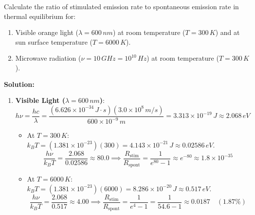 \begin{example}
Calculate the ratio of stimulated emission rate to spontaneous emission rate in thermal equilibrium for:
\begin{enumerate}
    \item Visible orange light ($\lambda = 600\,\si{nm}$) at room temperature ($T = 300\,\si{K}$) and at sun surface temperature ($T = 6000\,\si{K}$).
    \item Microwave radiation ($\nu = 10\,\si{GHz} = 10^{10}\,\si{Hz}$) at room temperature ($T = 300\,\si{K}$).
\end{enumerate}

\textbf{Solution:}
\begin{enumerate}
    \item \textbf{Visible Light ($\lambda = 600\,\si{nm}$)}:
    \begin{equation*}
        h\nu = \frac{hc}{\lambda} = \frac{(6.626 \times 10^{-34}\,\si{J\cdot s})(3.0 \times 10^8\,\si{m/s})}{600 \times 10^{-9}\,\si{m}} = 3.313 \times 10^{-19}\,\si{J} \approx 2.068\,\si{eV}
    \end{equation*}
    \begin{itemize}
        \item At $T = 300\,\si{K}$: $k_B T = (1.381 \times 10^{-23})(300) = 4.143 \times 10^{-21}\,\si{J} \approx 0.02586\,\si{eV}$.
        \begin{equation*}
            \frac{h\nu}{k_B T} = \frac{2.068}{0.02586} \approx 80.0 \implies \frac{R_{\text{stim}}}{R_{\text{spont}}} = \frac{1}{e^{80} - 1} \approx e^{-80} \approx 1.8 \times 10^{-35}
        \end{equation*}
        \item At $T = 6000\,\si{K}$: $k_B T = (1.381 \times 10^{-23})(6000) = 8.286 \times 10^{-20}\,\si{J} \approx 0.517\,\si{eV}$.
        \begin{equation*}
            \frac{h\nu}{k_B T} = \frac{2.068}{0.517} \approx 4.00 \implies \frac{R_{\text{stim}}}{R_{\text{spont}}} = \frac{1}{e^4 - 1} = \frac{1}{54.6 - 1} \approx 0.0187 \quad (1.87\%)
        \end{equation*}
    \end{itemize}
    

\end{enumerate}
\end{example}
